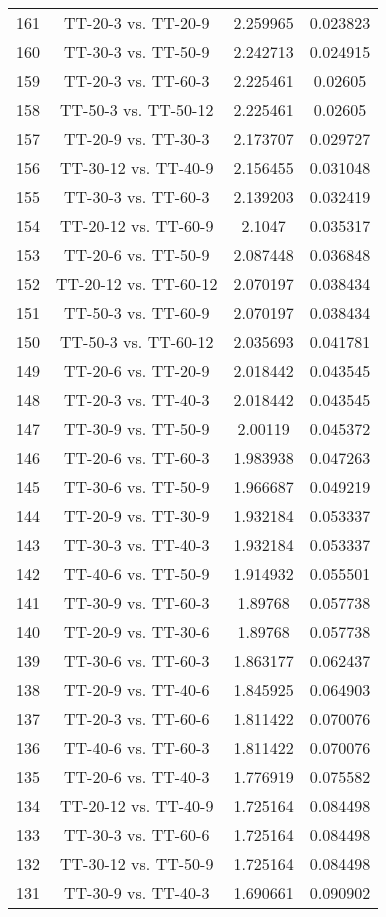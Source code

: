 \documentclass[a4paper,10pt]{article}
\begin{document}
\begin{landscape}
\begin{table}[!htp]
\begin{tabular}{cccc}
161&TT-20-3 vs. TT-20-9&2.259965&0.023823\\
160&TT-30-3 vs. TT-50-9&2.242713&0.024915\\
159&TT-20-3 vs. TT-60-3&2.225461&0.02605\\
158&TT-50-3 vs. TT-50-12&2.225461&0.02605\\
157&TT-20-9 vs. TT-30-3&2.173707&0.029727\\
156&TT-30-12 vs. TT-40-9&2.156455&0.031048\\
155&TT-30-3 vs. TT-60-3&2.139203&0.032419\\
154&TT-20-12 vs. TT-60-9&2.1047&0.035317\\
153&TT-20-6 vs. TT-50-9&2.087448&0.036848\\
152&TT-20-12 vs. TT-60-12&2.070197&0.038434\\
151&TT-50-3 vs. TT-60-9&2.070197&0.038434\\
150&TT-50-3 vs. TT-60-12&2.035693&0.041781\\
149&TT-20-6 vs. TT-20-9&2.018442&0.043545\\
148&TT-20-3 vs. TT-40-3&2.018442&0.043545\\
147&TT-30-9 vs. TT-50-9&2.00119&0.045372\\
146&TT-20-6 vs. TT-60-3&1.983938&0.047263\\
145&TT-30-6 vs. TT-50-9&1.966687&0.049219\\
144&TT-20-9 vs. TT-30-9&1.932184&0.053337\\
143&TT-30-3 vs. TT-40-3&1.932184&0.053337\\
142&TT-40-6 vs. TT-50-9&1.914932&0.055501\\
141&TT-30-9 vs. TT-60-3&1.89768&0.057738\\
140&TT-20-9 vs. TT-30-6&1.89768&0.057738\\
139&TT-30-6 vs. TT-60-3&1.863177&0.062437\\
138&TT-20-9 vs. TT-40-6&1.845925&0.064903\\
137&TT-20-3 vs. TT-60-6&1.811422&0.070076\\
136&TT-40-6 vs. TT-60-3&1.811422&0.070076\\
135&TT-20-6 vs. TT-40-3&1.776919&0.075582\\
134&TT-20-12 vs. TT-40-9&1.725164&0.084498\\
133&TT-30-3 vs. TT-60-6&1.725164&0.084498\\
132&TT-30-12 vs. TT-50-9&1.725164&0.084498\\
131&TT-30-9 vs. TT-40-3&1.690661&0.090902\\

\end{tabular}
\end{table}
\end{landscape}
\end{document}
